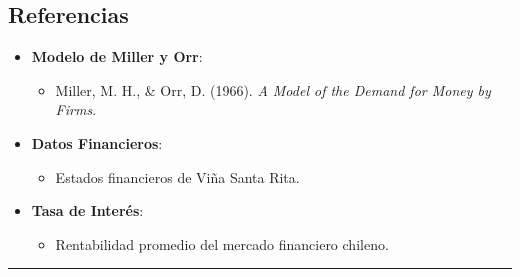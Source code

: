 \documentclass[
  letterpaper,
  DIV=11,
  numbers=noendperiod]{scrartcl}
\providecommand{\tightlist}{%
  \setlength{\itemsep}{0pt}\setlength{\parskip}{0pt}}\usepackage{longtable,booktabs,array}
\begin{document}
\subsection{Referencias}\label{referencias-1}

\begin{itemize}
\tightlist
\item
  \textbf{Modelo de Miller y Orr}:

  \begin{itemize}
  \tightlist
  \item
    Miller, M. H., \& Orr, D. (1966). \emph{A Model of the Demand for
    Money by Firms}.
  \end{itemize}
\item
  \textbf{Datos Financieros}:

  \begin{itemize}
  \tightlist
  \item
    Estados financieros de Viña Santa Rita.
  \end{itemize}
\item
  \textbf{Tasa de Interés}:

  \begin{itemize}
  \tightlist
  \item
    Rentabilidad promedio del mercado financiero chileno.
  \end{itemize}
\end{itemize}

\begin{center}\rule{0.5\linewidth}{0.5pt}\end{center}
\end{document}

